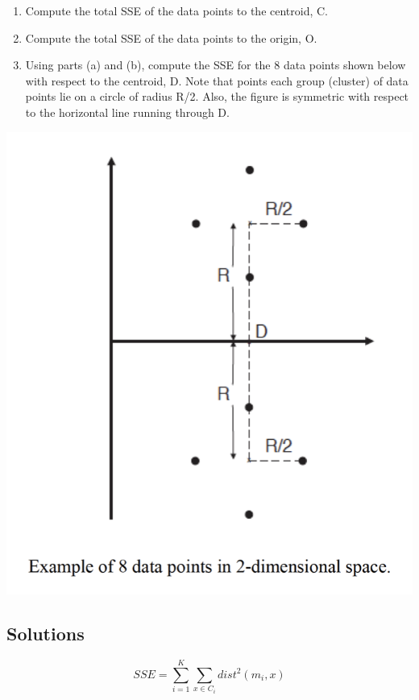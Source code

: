 \documentclass{article}
\begin{document}
\begin{enumerate}
    \item Compute the total SSE of the data points to the centroid, C.
    \item Compute the total SSE of the data points to the origin, O.
    \item Using parts (a) and (b), compute the SSE for the 8 data points shown below with respect to the centroid, D. Note that points each group (cluster) of data points lie on a circle of radius R/2. Also, the figure is symmetric with respect to the horizontal line running through D.
\end{enumerate}
\begin{center}
    \includegraphics[scale=0.5]{./images/Q2C.png}
\end{center}

\subsection*{Solutions}

\begin{equation}
    SSE = \sum_{i=1}^{K} \sum_{x \in C_i}^{} dist^2(m_i, x)
\end{equation}
\end{document}
